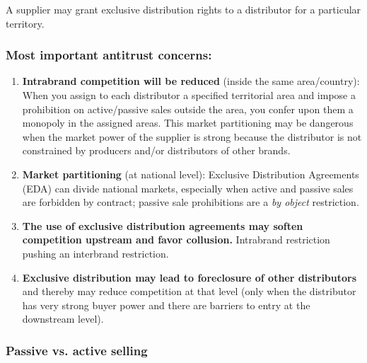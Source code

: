     A supplier may grant exclusive distribution rights to a distributor for a particular territory.

    
    \subsubsection{Most important antitrust concerns:}
    
    \begin{enumerate}[label=\alph*.]
        \item \textbf{Intrabrand competition will be reduced} (inside the same area/country): When you assign to each distributor a specified territorial area and impose a prohibition on active/passive sales outside the area, you confer upon them a monopoly in the assigned areas. This market partitioning may be dangerous when the market power of the supplier is strong because the distributor is not constrained by producers and/or distributors of other brands.
    
        \item \textbf{Market partitioning} (at national level): Exclusive Distribution Agreements (EDA) can divide national markets, especially when active and passive sales are forbidden by contract; passive sale prohibitions are a \emph{by object} restriction.
    
        \item \textbf{The use of exclusive distribution agreements may soften competition upstream and favor collusion.} Intrabrand restriction pushing an interbrand restriction.
    
        \item \textbf{Exclusive distribution may lead to foreclosure of other distributors }and thereby may reduce competition at that level (only when the distributor has very strong buyer power and there are barriers to entry at the downstream level).
    \end{enumerate}


    \subsubsection{Passive vs. active selling}
    
